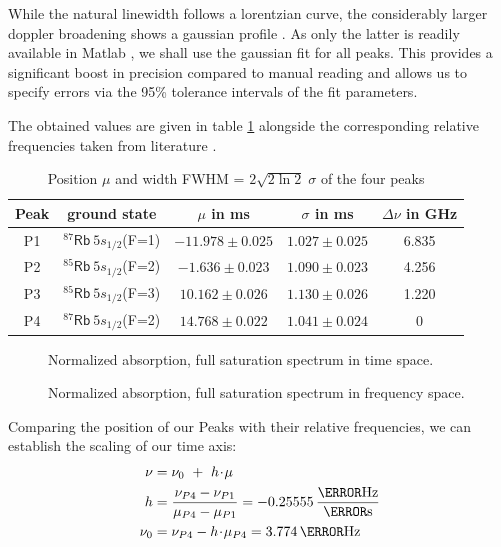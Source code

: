 While the natural linewidth follows a lorentzian curve, the considerably larger doppler broadening shows a gaussian profile \cite{lit:SAS}. As only the latter is readily available in Matlab \cite{lit:fittypes}, we shall use the gaussian fit for all peaks. This provides a significant boost in precision compared to manual reading and allows us to specify errors via the 95\% tolerance intervals of the fit parameters.

The obtained values are given in table \ref{tab:raw} alongside the corresponding relative frequencies taken from literature \cite{lit:Rb85, lit:Rb87}.

\begin{table}[h]
 \centering
 \caption{Position $\mu$ and width FWHM = $2 \sqrt{2 \ln 2} \; \sigma$ of the four peaks}
 \label{tab:raw}
 \begin{tabular}{ccccc}
  \toprule
  Peak	& ground state 	& $\mu$ in ms 		& $\sigma$ in ms 		& $\Delta \nu$ in GHz	\\
  \midrule
  P1		& $^{87}\mathsf{Rb}~5s_{1/2}$(F=1)	& $-11.978 \pm 0.025$	& $1.027 \pm 0.025$ 	& 6.835		\\
  P2		& $^{85}\mathsf{Rb}~5s_{1/2}$(F=2)	& $-1.636 \pm 0.023$	& $1.090 \pm 0.023$ 	& 4.256		\\
  P3		& $^{85}\mathsf{Rb}~5s_{1/2}$(F=3)	& $10.162 \pm 0.026$	& $1.130 \pm 0.026$ 	& 1.220		\\
  P4		& $^{87}\mathsf{Rb}~5s_{1/2}$(F=2)	& $14.768 \pm 0.022$	& $1.041 \pm 0.024$ 	& 0			\\
  \bottomrule
 \end{tabular}
\end{table}

\begin{figure}[p]
	\centering
	
	\vspace{-2em}
	\caption{Normalized absorption, full saturation spectrum in time space.}
	\label{fig:spectrum}
	\vspace{1em}
	
	\vspace{-2em}
	\caption{Normalized absorption, full saturation spectrum in frequency space.}
	\label{fig:spectrum2}
\end{figure}

Comparing the position of our Peaks with their relative frequencies, we can establish the scaling of our time axis:
\begin{align}
	\nu   &= \nu_0 ~+~ h \cdt \mu \\
	 h    &= \frac{\nu_{P4} - \nu_{P1}}{\mu_{P4} - \mu_{P1}} = -0.25555 \,\frac{\giga\hertz}{\micro\second}\\
	\nu_0 &= \nu_{P4} - h \cdt \mu_{P4}  = 3.774 \,\giga\hertz
\end{align}

